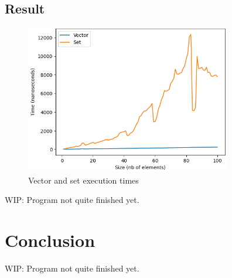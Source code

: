 \documentclass[conference]{IEEEtran} \IEEEoverridecommandlockouts
\begin{document}
\subsection{Result}



\begin{figure}[!h]
	\includegraphics[width=9cm]{Diagram/insertion.png}
	\caption{Vector and set execution times}
	\label{vector vs set}
\end{figure}

WIP: Program not quite finished yet.

\section{Conclusion}

WIP: Program not quite finished yet.

 
\end{document}
